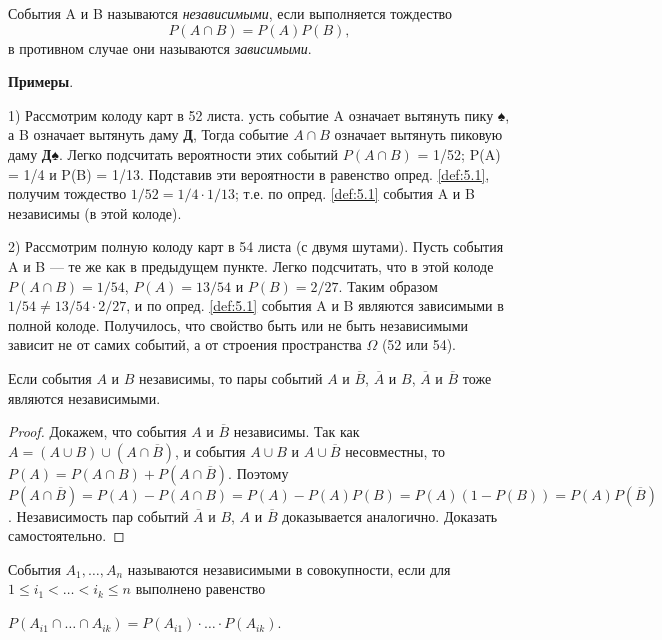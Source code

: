 
\begin{definition} 
\label{def:5.1}
События A и B называются \textit{независимыми}, если выполняется тождество
\begin{equation*}
	P(A \cap B) = P(A)P(B),
\end{equation*}
в противном случае они называются \textit{зависимыми}.
\end{definition}
	
\textbf{Примеры}. 

1) Рассмотрим колоду карт в 52 листа. 
усть событие A означает вытянуть пику ♠, а B означает вытянуть даму \textbf{Д}, Тогда событие $A\cap B$ означает вытянуть пиковую даму \textbf{Д♠}. Легко подсчитать вероятности этих событий $P(A\cap B)$ = 1/52; P(A) = 1/4 и P(B) = 1/13. Подставив эти вероятности в равенство опред. \ref{def:5.1}, получим тождество $1/52 = 1/4 \cdot1/13$; т.е. по опред. \ref{def:5.1} события A и B независимы (в этой колоде).


2) Рассмотрим полную колоду карт в 54 листа (с двумя шутами). 
Пусть события A и B — те же как в предыдущем пункте. 
Легко подсчитать, что в этой колоде $P(A \cap B) = 1/54$, $P(A) = 13/54$ и $P(B) = 2/27$. 
Таким образом $1/54 \neq 13/54 \cdot 2/27$, и по опред. \ref{def:5.1} события A и B являются зависимыми в полной колоде. 
Получилось, что свойство быть или не быть независимыми зависит не от самих событий, а от строения пространства $\Omega$ (52 или 54).

\begin{lemma}
Если события $A$ и $B$ независимы, то пары событий $A$ и $\overline{B}$, $\overline{A}$ и $B$, $\overline{A}$ и $\overline{B}$ тоже являются независимыми.
\end{lemma}
\begin{proof}
 Докажем, что события $A$ и $\overline{B}$ независимы. Так как 
 $A =(A \cup B)\cup(A \cap \overline{B})$, и события $A\cup B$ и $A\cup \overline{B}$ несовместны, то  $P(A) = P(A\cap B)+P(A\cap\overline{B})$. 
Поэтому $P(A \cap  \overline{B}) = P(A) − P(A \cap  B) = P(A) − P(A)P(B) =
P(A)(1 − P(B)) = P(A)P(\overline{B})$.
Независимость пар событий $\overline{A}$ и $B$, $A$ и $\overline{B}$ доказывается аналогично. Доказать самостоятельно.
\end{proof}

\begin{definition}
События $A_1,\dots,A_n$ называются независимыми в совокупности, если для $1 \leqslant i_1 < \dots < i_k \leqslant n$ выполнено равенство

$P(A_{i1}\cap \dots \cap  A_{ik}) = P(A_{i1}) \cdot\dots\cdot P(A_{ik})$.
\end{definition}

